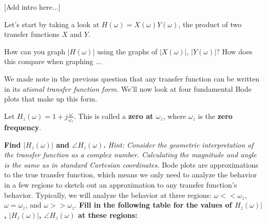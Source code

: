 
[Add intro here...]


\begin{enumerate}

\qitem Let's start by taking a look at $H(\omega) = X(\omega)Y(\omega)$, the product of two transfer functions $X$ and $Y$.
\begin{enumerate}
    \qitem How can you graph $|H(\omega)|$ using the graphs of $|X(\omega)|$, $|Y(\omega)|$?
    \qitem How does this compare when graphing ...
\end{enumerate}

\sol{
}

We made note in the previous question that any transfer function can be written in its \textit{ational transfer function form.}
We'll now look at four fundamental Bode plots that make up this form.

\qitem Let $H_z(\omega) = 1 + j \frac{\omega}{\omega_z}$. This is called a \textbf{zero at $\omega_z$}, where $\omega_z$ is the \textbf{zero frequency}.
\begin{enumerate}
    \qitem \textbf{Find $|H_z(\omega)|$ and $\angle H_z(\omega)$.}
           \textit{Hint: Consider the geometric interpretation of the transfer function as a complex number.
           Calculating the magnitude and angle is the same as in standard Cartesian coordinates.}
    \qitem Bode plots are approximations to the true transfer function, which means we only need to analyze the behavior in a few regions to sketch out an approximation to any transfer function's behavior.
    Typically, we will analyze the behavior at three regions: $\omega << \omega_z$, $\omega = \omega_z$, and $\omega >> \omega_z$.
    \textbf{Fill in the following table for the values of $H_z(\omega)|$, $|H_z(\omega)|$, $\angle H_z(\omega)$ at these regions:}


\end{enumerate}
\end{enumerate}
